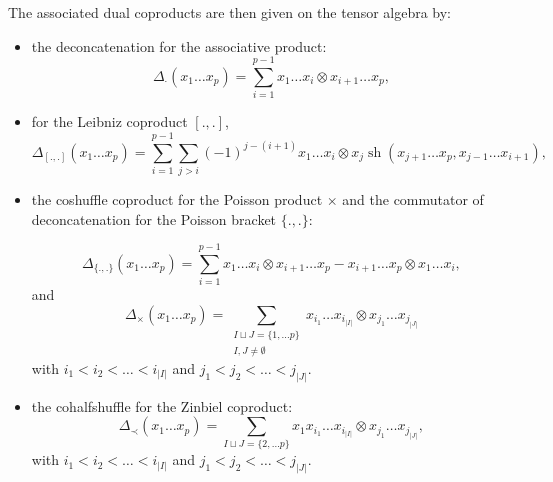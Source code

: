 \documentclass[11pt,leqno]{amsart}
\theoremstyle{definition}
\theoremstyle{plain}
\begin{document}
The associated dual coproducts are then given on the tensor algebra by:
\begin{itemize}
\item the deconcatenation for the associative product: 
\begin{equation*}
\Delta_{\cdot}(x_1 \ldots x_p) = \sum_{i=1}^{p-1} x_1 \ldots x_i \otimes x_{i+1} \ldots x_{p},
\end{equation*}

\item for the Leibniz coproduct $[.,.]$, 
\begin{equation*}
\Delta_{[.,.]}(x_1 \ldots x_p)= \sum_{i=1}^{p-1} \sum_{j > i} (-1)^{j-(i+1)} x_1 \ldots x_i \otimes x_j \operatorname{sh} (x_{j+1} \ldots x_p, x_{j-1} \ldots x_{i+1}),
\end{equation*}

\item the coshuffle coproduct for the Poisson product $\times$ and
 the commutator of deconcatenation for the Poisson bracket $\lbrace . , . \rbrace$: 
 
 \begin{equation*}
\Delta_{\lbrace .,. \rbrace} (x_1 \ldots x_p) = \sum_{i=1}^{p-1} x_1 \ldots x_i \otimes x_{i+1} \ldots x_{p} - x_{i+1} \ldots x_{p} \otimes x_1 \ldots x_i,
 \end{equation*}
 and
  \begin{equation*}
\Delta_{\times}(x_1 \ldots x_p) = \sum_{\substack{I \sqcup J =\{1, \ldots p\} \\ I,J \neq \emptyset}} x_{i_1} \ldots x_{i_{|I|}} \otimes x_{j_1}  \ldots x_{j_{|J|}}
 \end{equation*}
with $i_1<i_2< \ldots <i_{|I|}$ and $j_1<j_2<\ldots<j_{|J|}$.

\item the cohalfshuffle for the Zinbiel coproduct: 
\begin{equation*}
\Delta_{\prec} (x_1 \ldots x_p) =\sum_{I \sqcup J =\{2, \ldots p\}} x_1 x_{i_1} \ldots x_{i_{|I|}} \otimes x_{j_1}  \ldots x_{j_{|J|}},
\end{equation*}
with $i_1<i_2< \ldots <i_{|I|}$ and $j_1<j_2<\ldots<j_{|J|}$.
\end{itemize}
\end{document}
